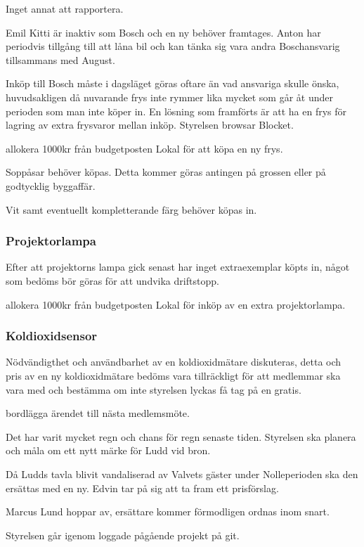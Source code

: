 \documentclass{protokoll}
\begin{document}
Inget annat att rapportera.

Emil Kitti är inaktiv som Bosch och en ny behöver framtages. Anton har periodvis tillgång till att låna bil och kan tänka sig vara andra Boschansvarig tillsammans med August. 


Inköp till Bosch måste i dagsläget göras oftare än vad ansvariga skulle önska, huvudsakligen då nuvarande frys inte rymmer lika mycket som går åt under perioden som man inte köper in. En lösning som framförts är att ha en frys för lagring av extra frysvaror mellan inköp. Styrelsen browsar Blocket. 
\begin{beslut}
    \att allokera 1000kr från budgetposten Lokal för att köpa en ny frys.
\end{beslut}

Soppåsar behöver köpas. Detta kommer göras antingen på grossen eller på godtycklig byggaffär.

Vit samt eventuellt kompletterande färg behöver köpas in. 


\subsubsection{Projektorlampa}
Efter att projektorns lampa gick senast har inget extraexemplar köpts in, något som bedöms bör göras för att undvika driftstopp. 
\begin{beslut}
    \att allokera 1000kr från budgetposten Lokal för inköp av en extra projektorlampa.
\end{beslut}

\subsubsection{Koldioxidsensor}
Nödvändigthet och användbarhet av en koldioxidmätare diskuteras, detta och pris av en ny koldioxidmätare bedöms vara tillräckligt för att medlemmar ska vara med och bestämma om inte styrelsen lyckas få tag på en gratis. 
\begin{beslut}
    \att bordlägga ärendet till nästa medlemsmöte.
\end{beslut}

Det har varit mycket regn och chans för regn senaste tiden. Styrelsen ska planera och måla om ett nytt märke för Ludd vid bron.

Då Ludds tavla blivit vandaliserad av Valvets gäster under Nolleperioden ska den ersättas med en ny. 
Edvin tar på sig att ta fram ett prisförslag. 

Marcus Lund hoppar av, ersättare kommer förmodligen ordnas inom snart.

Styrelsen går igenom loggade pågående projekt på git.
\end{document}
